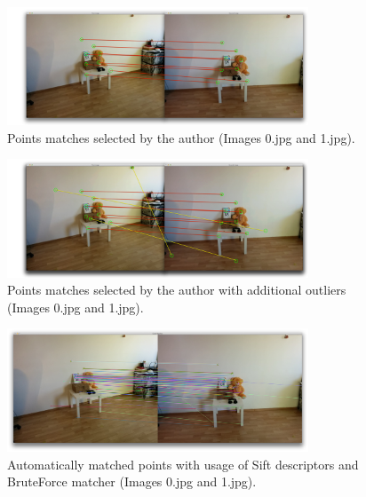 \begin{figure}[h!]
    \centering
    \includegraphics[width=0.8\textwidth]{01_matching}
    \caption{Points matches selected by the author (Images 0.jpg and 1.jpg).}
    \label{fig:01_matching}
\end{figure}
\begin{figure}[h!]
    \centering
    \includegraphics[width=0.8\textwidth]{01_matching_outliers}
    \caption{Points matches selected by the author with additional outliers (Images 0.jpg and 1.jpg).}
    \label{fig:01_matching_outliers}
\end{figure}
\begin{figure}[h!]
    \centering
    \includegraphics[width=0.8\textwidth]{f_01_auto_sift}
    \caption{Automatically matched points with usage of Sift descriptors and BruteForce matcher (Images 0.jpg and 1.jpg).}
    \label{fig:f_01_auto_sift}
\end{figure}

